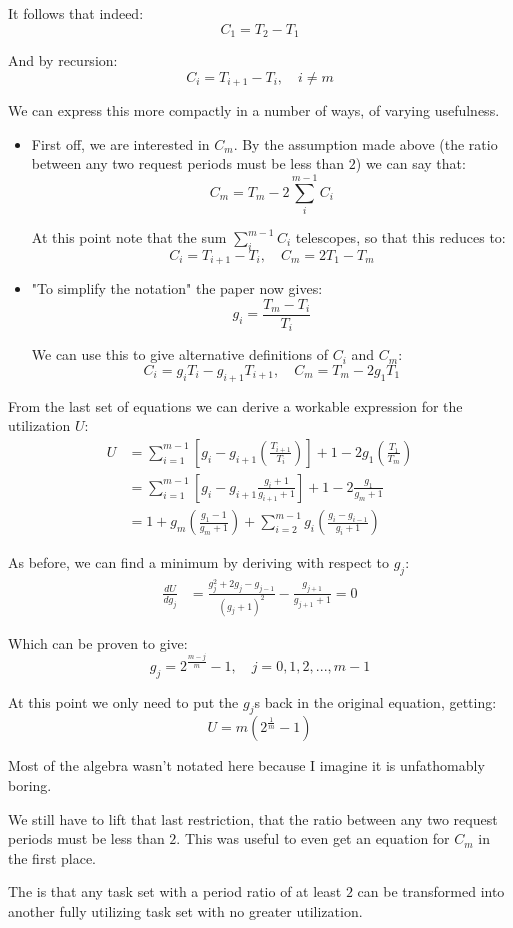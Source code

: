 \documentclass[a4paper,11pt]{article}
\begin{document}
It follows that indeed:
$$
	C_1 = T_2 - T_1
$$

And by recursion:
$$
	C_i = T_{i + 1} - T_i, \quad i \neq m
$$

We can express this more compactly in a number of ways, of varying usefulness.
\begin{itemize}
	\item First off, we are interested in $C_m$. By the assumption made above (the ratio between any two request periods must be less than $2$) we can say that:
	      $$
		      C_m = T_m - 2 \sum_i^{m - 1} C_i
	      $$

	      At this point note that the sum $\sum_i^{m - 1} C_i$ telescopes, so that this reduces to:
	      $$
		      C_i = T_{i + 1} - T_i, \quad
		      C_m = 2 T_1 - T_m
	      $$

	\item "To simplify the notation" the paper now gives:
	      $$
		      g_i = \frac{T_m - T_i}{T_i}
	      $$

	      We can use this to give alternative definitions of $C_i$ and $C_m$:
	      $$
		      C_i = g_i T_i - g_{i + 1} T_{i + 1}, \quad
		      C_m = T_m - 2 g_1 T_1
	      $$

\end{itemize}

From the last set of equations we can derive a workable expression for the utilization $U$:
$$
	\begin{aligned}
		U
		 & = \sum_{i=1}^{m-1}
		\left[
			g_i - g_{i+1}\left(\frac{T_{i+1}}{T_i}\right)
			\right]
		+ 1 - 2g_1\left(\frac{T_1}{T_m}\right)
		\\[6pt]
		 & = \sum_{i=1}^{m-1}
		\left[
			g_i - g_{i+1}\frac{g_i+1}{g_{i+1}+1}
			\right]
		+ 1 - 2\frac{g_1}{g_m+1}
		\\[6pt]
		 & = 1
		+ g_m\left(\frac{g_1-1}{g_m+1}\right)
		+ \sum_{i=2}^{m-1}
		g_i\left(\frac{g_i-g_{i-1}}{g_i+1}\right)
	\end{aligned}
$$

As before, we can find a minimum by deriving with respect to $g_j$:
$$
	\begin{aligned}
		\frac{d U}{d g_j}
		 & =
		\frac{g_j^2+2g_j-g_{j-1}}{(g_j+1)^2}
		-\frac{g_{j+1}}{g_{j+1}+1}
		=0
	\end{aligned}
$$

Which can be proven to give:
$$
	g_j = 2^{\frac{m - j}{m}} - 1, \quad j = 0, 1, 2, ..., m-1
$$

At this point we only need to put the $g_j$s back in the original equation, getting:
$$
	U = m (2^{\frac{1}{m}} - 1)
$$

Most of the algebra wasn't notated here because I imagine it is unfathomably boring.

\par\smallskip

We still have to lift that last restriction, that the ratio between any two request periods must be less than $2$.
This was useful to even get an equation for $C_m$ in the first place.

The is that any task set with a period ratio of at least $2$ can be transformed into another fully utilizing task set with no greater utilization.
\end{document}
